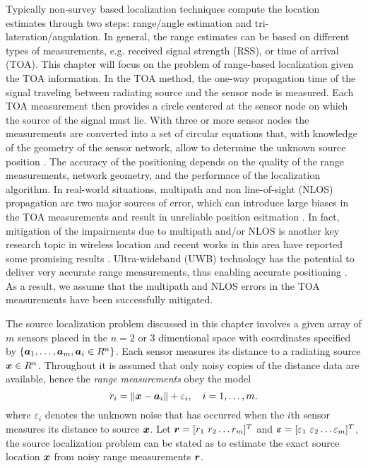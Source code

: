 Typically non-survey based localization techniques compute the location estimates through two steps: range/angle estimation and tri-lateration/angulation\cite{GeoLoc}. In general, the range estimates can be based on different types of measurements, e.g. received signal strength (RSS), %
or time of arrival (TOA). %
This chapter will focus on the  problem of range-based localization given the TOA information. In the TOA method, the one-way propagation time of the signal traveling between radiating source and the sensor node is measured. Each TOA measurement then provides a circle centered at the sensor node on which the source of the signal must lie. With three or more sensor nodes the measurements are converted into a set of circular equations that, with knowledge of the geometry of the sensor network, allow to determine the unknown source position \cite{GeoLoc}. The accuracy of the positioning depends on the quality of the range measurements, network geometry, and the performace of the localization algorithm. In real-world situations, multipath and non line-of-sight (NLOS) propagation are two major sources of error, which can introduce large biases in the TOA measurements and result in unreliable position esitmation \cite{classMDS}. In fact, mitigation of the impairments due to multipath and/or NLOS is another key
research topic in wireless location and recent works in this area have reported some promising results \cite{DarWinUWB}. Ultra-wideband (UWB) technology has the potential to deliver very accurate range measurements, thus enabling accurate positioning \cite{UWB, DarWinUWB, RydstromUWB}. As a result, we assume that the multipath and NLOS errors in the TOA measurements have been successfully mitigated.  

The source localization problem discussed in this chapter involves a given array of $m$ sensors placed in the $n = 2$ or 3 dimentional space with coordinates specified by $\{\mbox{\boldmath$a$}_1,\ldots, \mbox{\boldmath$a$}_m, \mbox{\boldmath$a$}_i\in R^n\}$. Each sensor measures its distance to a radiating source $\mbox{\boldmath$x$}\in R^n$. Throughout it is assumed that only noisy copies of the distance data are available, hence the \textit{range measurements} obey the model
\begin{equation} \label{eq:4.1}
\setcounter{equation}{1}
r_i = \|{\Bx} - {\Ba}_i\| + \varepsilon_i, \quad i = 1, \ldots , m.
\end{equation}    
where $\varepsilon_i$ denotes the unknown noise that has occurred when the $i$th sensor measures its distance to source $\mbox{\boldmath$x$}$. Let $\mbox{\boldmath$r$}=[r_1 \ r_2 \ldots r_m]^T$ and $\mbox{\boldmath${\varepsilon}$}=[\varepsilon_1 \ \varepsilon_2 \ldots \varepsilon_m]^T$, the source localization problem can be stated as to estimate the exact source location $\mbox{\boldmath$x$}$ from noisy range measurements $\mbox{\boldmath$r$}$. 

